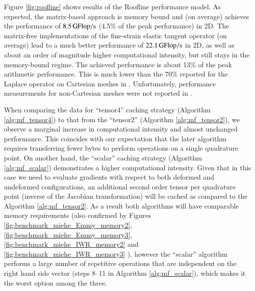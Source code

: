 \documentclass[times,doublespace]{nmeauth}
\begin{document}
{\color{red}
Figure \ref{fig:roofline} shows results of the Roofline performance model.
As expected, the matrix-based approach is memory bound and (on average) achieves the performance of $8.5\,\rm{GFlop/s}$ (4.5\% of the peak performance) in 2D.
The matrix-free implementations of the fine-strain elastic tangent operator (on average) lead to a much better performance of
$22.1\,\rm{GFlop/s}$ in 2D, as well as about an order of magnitude higher computational intensity, but still stays in the memory-bound regime.
The achieved performance is about 13\% of the peak arithmetic performance. This is much lower than the
70\% reported for the Laplace operator on Cartesian meshes in \cite{kronbichler12}.
Unfortunately, performance measurements for non-Cartesian meshes were not reported in \cite{kronbichler12}.

When comparing the data for ``tensor4'' caching strategy (Algorithm \ref{alg:mf_tensor4}) to that from the ``tensor2'' (Algorithm \ref{alg:mf_tensor2}),
we observe a marginal increase in computational intensity and almost unchanged performance.
This coincides with our expectation that the later algorithm requires transferring fewer bytes to perform operations on a single quadrature point.
On another hand, the ``scalar'' caching strategy (Algorithm \ref{alg:mf_scalar}) demonstrates a higher computational intensity.
Given that in this case we need to evaluate gradients with respect to both deformed and undeformed configurations, an additional
second order tensor per quadrature point (inverse of the Jacobian transformation) will be cached as compared to the Algorithm \ref{alg:mf_tensor2}.
As a result both algorithms will have comparable memory requirements (also confirmed by Figures \ref{fig:benchmark_miehe_Emmy_memory2}, \ref{fig:benchmark_miehe_Emmy_memory3}, \ref{fig:benchmark_miehe_IWR_memory2} and \ref{fig:benchmark_miehe_IWR_memory3} ),
however the ``scalar'' algorithm performs a large number of repetitive operations that are
independent on the right hand side vector (steps 8--11 in Algorithm \ref{alg:mf_scalar}), which makes it the worst option among the three.

}
\end{document}
